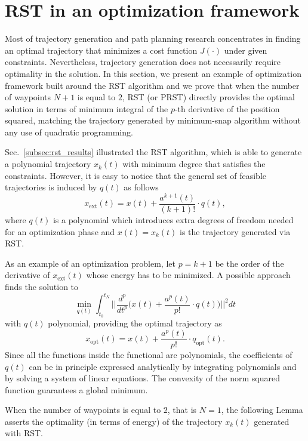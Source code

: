 \section{RST in an optimization framework}
\label{subsec:rst_optimization}
Most of trajectory generation and path planning research concentrates in finding an optimal trajectory that minimizes a cost function $J(\cdot)$ under given constraints. Nevertheless, trajectory generation does not necessarily require optimality in the solution. In this section, we present an example of optimization framework built around the RST algorithm and we prove that when the number of waypoints $N+1$ is equal to $2$, RST (or PRST) directly provides the optimal solution in terms of minimum integral of the $p$-th derivative of the position squared, matching the trajectory generated by minimum-snap algorithm \cite{5980409} without any use of quadratic programming.

Sec.~\ref{subsec:rst_results} illustrated the RST algorithm, which is able to generate a polynomial trajectory $x_k(t)$ with minimum degree that satisfies the constraints. However, it is easy to notice that the general set of feasible trajectories is induced by $q(t)$ as follows
\begin{equation}
x_{\text{ext}}(t) = x(t)+\frac{a^{k+1}(t)}{(k+1)!}\cdot q(t),
\end{equation}
where $q(t)$ is a polynomial which introduces extra degrees of freedom needed for an optimization phase and $x(t)=x_k(t)$ is the trajectory generated via RST. 

As an example of an optimization problem, let $p = k+1$ be the order of the derivative of $x_{\text{ext}}(t)$ whose energy has to be minimized. A possible approach finds the solution to
\begin{equation}
\min_{q(t)}{\int_{t_0}^{t_N}{\biggl|\biggl|\frac{d^p}{dt^p}\biggl(x(t)+\frac{a^p(t)}{p!}\cdot q(t)\biggr)\biggr|\biggr|^2 dt}}
\end{equation}
with $q(t)$ polynomial, providing the optimal trajectory as
\begin{equation}
x_{\text{opt}}(t)=x(t)+\frac{a^p(t)}{p!}\cdot q_{\text{opt}}(t).
\end{equation}
Since all the functions inside the functional are polynomials, the coefficients of $q(t)$ can be in principle expressed analytically by integrating polynomials and by solving a system of linear equations. The convexity of the norm squared function guarantees a global minimum. 

When the number of waypoints is equal to $2$, that is $N=1$, the following Lemma asserts the optimality (in terms of energy) of the trajectory $x_k(t)$ generated with RST.

